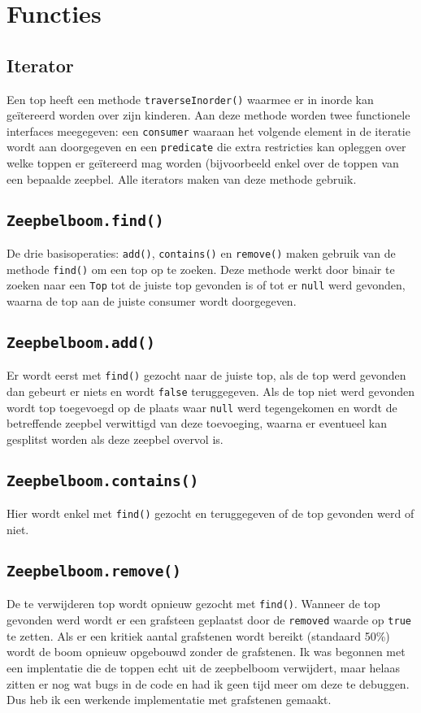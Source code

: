 \documentclass[12pt,hidelinks]{article}
\begin{document}
    \section{Functies}
    \subsection{Iterator}
    Een top heeft een methode {\tt traverseInorder()} waarmee er in inorde kan
    geïtereerd worden over zijn kinderen. Aan deze methode worden twee functionele
    interfaces meegegeven: een {\tt consumer} waaraan het volgende element in de iteratie
    wordt aan doorgegeven en een {\tt predicate} die extra restricties kan opleggen over
    welke toppen er geïtereerd mag worden (bijvoorbeeld enkel over de toppen van een
    bepaalde zeepbel.
    Alle iterators maken van deze methode gebruik.
    \subsection{\tt Zeepbelboom.find()}
    De drie basisoperaties: {\tt add()}, {\tt contains()} en {\tt remove()} maken gebruik
    van de methode {\tt find()} om een top op te zoeken. Deze methode werkt door binair
    te zoeken naar een {\tt Top} tot de juiste top gevonden is of tot er {\tt null} werd
    gevonden, waarna de top aan de juiste consumer wordt doorgegeven.
    \subsection{\tt Zeepbelboom.add()}
    Er wordt eerst met {\tt find()} gezocht naar de juiste top, als de top werd gevonden
    dan gebeurt er niets en wordt {\tt false} teruggegeven. Als de top niet werd gevonden
    wordt top toegevoegd op de plaats waar {\tt null} werd tegengekomen en wordt de
    betreffende zeepbel verwittigd van deze toevoeging, waarna er eventueel kan gesplitst
    worden als deze zeepbel overvol is.
    \subsection{\tt Zeepbelboom.contains()}
    Hier wordt enkel met {\tt find()} gezocht en teruggegeven of de top gevonden werd
    of niet.
    \subsection{\tt Zeepbelboom.remove()}
    De te verwijderen top wordt opnieuw gezocht met {\tt find()}. Wanneer de top gevonden
    werd wordt er een grafsteen geplaatst door de {\tt removed} waarde op {\tt true} te
    zetten. Als er een kritiek aantal grafstenen wordt bereikt (standaard 50\%) wordt
    de boom opnieuw opgebouwd zonder de grafstenen.
    \newline \newline
    Ik was begonnen met een implentatie die de toppen echt uit de zeepbelboom verwijdert,
    maar helaas zitten er nog wat bugs in de code en had ik geen tijd meer om deze te
    debuggen. Dus heb ik een werkende implementatie met grafstenen gemaakt.
\end{document}
